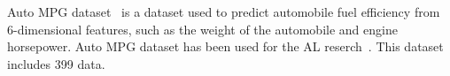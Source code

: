 Auto MPG dataset~\citep{auto_mpg_9} is a dataset used to predict automobile fuel efficiency from 6-dimensional features, such as the weight of the automobile and engine horsepower.
%
Auto MPG dataset has been used for the AL reserch~\citep{park2020robust}.
%
This dataset includes 399 data.



